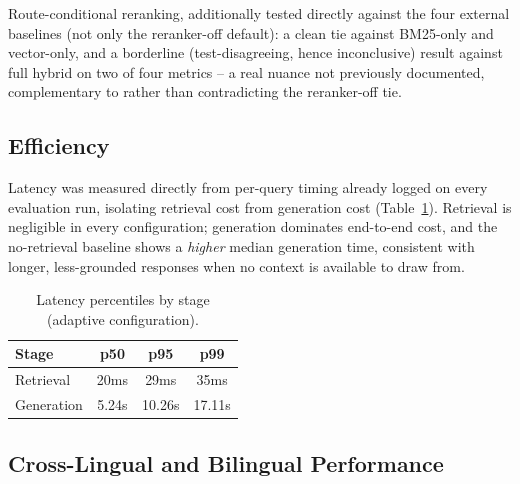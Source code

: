 \documentclass[a4paper,twoside]{article}
\begin{document}
Route-conditional reranking, additionally tested directly against the four external baselines (not only the reranker-off default): a clean tie against BM25-only and vector-only, and a borderline (test-disagreeing, hence inconclusive) result against full hybrid on two of four metrics -- a real nuance not previously documented, complementary to rather than contradicting the reranker-off tie.

\subsection{Efficiency}
\label{subsec:results-efficiency}

Latency was measured directly from per-query timing already logged on every evaluation run, isolating retrieval cost from generation cost (Table~\ref{tab:latency-report}). Retrieval is negligible in every configuration; generation dominates end-to-end cost, and the no-retrieval baseline shows a \emph{higher} median generation time, consistent with longer, less-grounded responses when no context is available to draw from.

\begin{table}[h]
\caption{Latency percentiles by stage (adaptive configuration).}\label{tab:latency-report}\centering
\begin{tabular}{|l|c|c|c|}
\hline
Stage & p50 & p95 & p99 \\
\hline
Retrieval & 20ms & 29ms & 35ms \\
Generation & 5.24s & 10.26s & 17.11s \\
\hline
\end{tabular}
\end{table}

\subsection{Cross-Lingual and Bilingual Performance}
\label{subsec:results-crosslingual}
\end{document}
